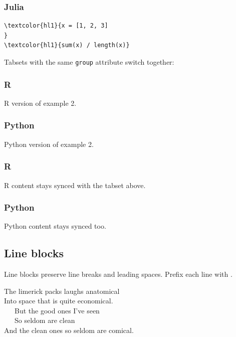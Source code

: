 \subsubsection{Julia}
\label{julia}




\begin{srccode}
\begin{Verbatim}[commandchars=\\\{\}]
\textcolor{hl1}{x = [1, 2, 3]
}
\textcolor{hl1}{sum(x) / length(x)}
\end{Verbatim}
\end{srccode}

Tabsets with the same \texttt{group} attribute switch together:



\subsubsection{R}
\label{r}

R version of example 2.

\subsubsection{Python}
\label{python}

Python version of example 2.



\subsubsection{R}
\label{r}

R content stays synced with the tabset above.

\subsubsection{Python}
\label{python}

Python content stays synced too.



\subsection{Line blocks}
\label{line-blocks}

Line blocks preserve line breaks and leading spaces. Prefix each line with \texttt{\textbar{}}.

The limerick packs laughs anatomical\\
Into space that is quite economical.\\
~~~But the good ones I've seen\\
~~~So seldom are clean\\
And the clean ones so seldom are comical.

